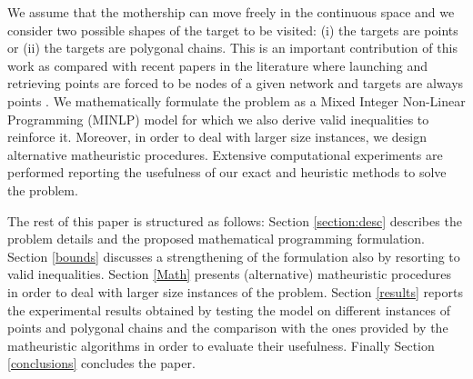 \documentclass{itor}
\theoremstyle{definition}
\theoremstyle{remark}
\begin{document}
We assume that the mothership can move freely in the continuous space and we consider two possible shapes of the target to be visited: (i) the targets are points or (ii) the targets are polygonal chains. This is an important contribution of this work as compared with recent papers in the literature where launching and retrieving points are forced to be nodes of a given network and targets are always points \citep{art:Cavani2021,art:Coindreau2021, art:Amico2021}.
We mathematically formulate the problem as a Mixed Integer Non-Linear Programming (MINLP) model for which we also derive valid inequalities to reinforce it.
Moreover, in order to deal with larger size instances, we design alternative matheuristic procedures. Extensive computational experiments are performed reporting the usefulness of our exact and heuristic methods to solve the problem.

The rest of this paper is structured as follows: Section \ref{section:desc} describes the problem details and the proposed mathematical programming formulation. Section \ref{bounds} discusses a strengthening of the formulation also by resorting to valid inequalities. Section \ref{Math} presents (alternative) matheuristic procedures in order to deal with larger size instances of the problem. Section \ref{results} reports the experimental results obtained by testing the model on different instances of points and polygonal chains and the comparison with the ones provided by the matheuristic algorithms in order to evaluate their usefulness. Finally Section \ref{conclusions} concludes the paper.
\end{document}

